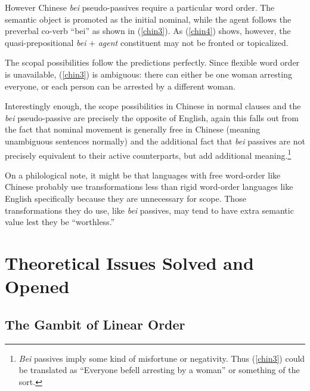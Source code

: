 \documentclass{article}
\begin{document}
However Chinese \emph{bei} pseudo-passives require a particular word order. The semantic object is promoted as the initial nominal, while the agent follows the preverbal co-verb ``bei'' as shown in (\ref{chin3}). As (\ref{chin4}) shows, however, the quasi-prepositional \emph{bei} $+$ \emph{agent} constituent may not be fronted or topicalized.

\begin{exe}
\end{exe}

The scopal possibilities follow the predictions perfectly. Since flexible word order is unavailable, (\ref{chin3}) is ambiguous: there can either be one woman arresting everyone, or each person can be arrested by a different woman.

Interestingly enough, the scope possibilities in Chinese in normal clauses and the \emph{bei} pseudo-passive are precisely the opposite of English, again this falls out from the fact that nominal movement is generally free in Chinese (meaning unambiguous sentences normally) and the additional fact that \emph{bei} passives are not precisely equivalent to their active counterparts, but add additional meaning.\footnote{\emph{Bei} passives imply some kind of misfortune or negativity. Thus (\ref{chin3}) could be translated as ``Everyone befell arresting by a woman'' or something of the sort.}

On a philological note, it might be that languages with free word-order like Chinese probably use transformations less than rigid word-order languages like English specifically because they are unnecessary for scope. Those transformations they do use, like \emph{bei} passives, may tend to have extra semantic value lest they be ``worthless.''


\section{Theoretical Issues Solved and Opened}

\subsection{The Gambit of Linear Order}
\end{document}
